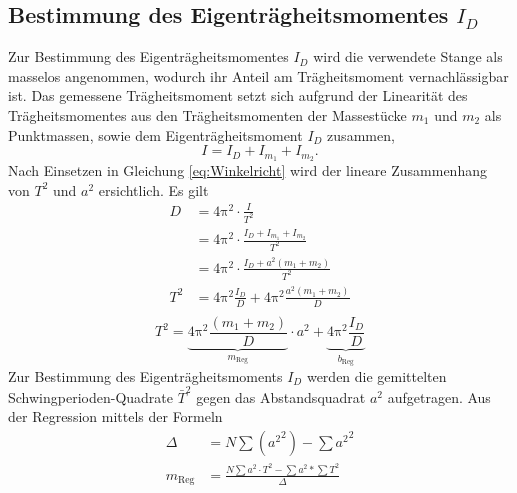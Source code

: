 \subsection{Bestimmung des Eigenträgheitsmomentes $I_D$}

Zur Bestimmung des Eigenträgheitsmomentes $I_D$ wird die verwendete Stange als masselos angenommen, wodurch ihr Anteil am Trägheitsmoment vernachlässigbar ist. 
Das gemessene Trägheitsmoment setzt sich aufgrund der Linearität des Trägheitsmomentes aus den Trägheitsmomenten der Massestücke $m_1$ und $m_2$ als Punktmassen, sowie dem Eigenträgheitsmoment $I_D$ zusammen,
\begin{equation}
	I= I_D+I_{m_1}+I_{m_2}.
\end{equation}
Nach Einsetzen in Gleichung \eqref{eq:Winkelricht} wird der lineare Zusammenhang von $T^2$ und $a^2$ ersichtlich.
Es gilt
\begin{align*}
	 D &= 4\mathup{\pi^{2}}\cdot\frac{I}{T^2}\\
	   &= 4\mathup{\pi^{2}}\cdot\frac{I_D+I_{m_1}+I_{m_2}}{T^2}\\
	   &= 4\mathup{\pi^{2}}\cdot\frac{I_D+a^{2}(m_1+m_2)}{T^2}\\
	T^2&= 4\mathup{\pi^{2}}\frac{I_D}{D}+4\mathup{\pi^{2}}\frac{a^{2}(m_1+m_2)}{D}\\
\end{align*}
\begin{equation}
	T^2= \underbrace{4\mathup{\pi^{2}}\frac{(m_1+m_2)}{D}}_{m_{\text{Reg}}}\cdot a^{2}+\underbrace{4\mathup{\pi^{2}}\frac{I_D}{D}}_{b_{\text{Reg}}}
\end{equation}
Zur Bestimmung des Eigenträgheitsmoments $I_D$ werden die gemittelten Schwingperioden-Quadrate $\bar{T}^2$ gegen das Abstandsquadrat $a^2$ aufgetragen. Aus der Regression mittels der Formeln
\begin{align}
	\Delta &= N \sum({a^2}^2) - {\sum{a^2}}^2\\
    m_{\text{Reg}} &= \frac{N\sum{a^2\cdot T^2} - \sum{a^2} * \sum{T^2}}{\Delta}\\
\end{align}
